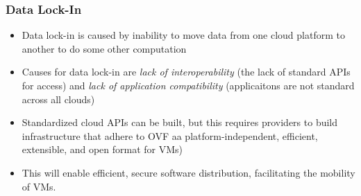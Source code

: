 \documentclass{article}
\begin{document}
\subsubsection{Data Lock-In}
\begin{itemize}
    \item Data lock-in is caused by inability to move data from one cloud platform to another to do some other computation
    
    \item Causes for data lock-in are \textit{lack of interoperability} (the lack of standard APIs for access) and \textit{lack of application compatibility} (applicaitons are not standard across all clouds)
    
    \item Standardized cloud APIs can be built, but this requires providers to build infrastructure that adhere to OVF aa platform-independent, efficient, extensible, and open format for VMs)
    
    \item This will enable efficient, secure software distribution, facilitating the mobility of VMs.
\end{itemize}
\end{document}
